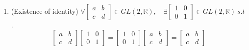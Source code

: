 \begin{solution}
\begin{enumerate}
        \item (Existence of identity) $\forall \begin{bmatrix}
            a & b\\ c & d
        \end{bmatrix} \in GL(2, \mathbb{R}), \quad \exists \begin{bmatrix}
            1 & 0\\0 & 1
        \end{bmatrix}\in GL(2, \mathbb{R}) \> s.t$.
        \[
            \begin{bmatrix}
                a & b\\ c & d
            \end{bmatrix}
            \begin{bmatrix}
                1 & 0\\0 & 1
            \end{bmatrix}
            = \begin{bmatrix}
                1 & 0\\0 & 1
            \end{bmatrix}
            \begin{bmatrix}
                a & b\\c & d
            \end{bmatrix}
            = \begin{bmatrix}
                a & b\\c & d
            \end{bmatrix}
        \]


\end{enumerate}
\end{solution}

